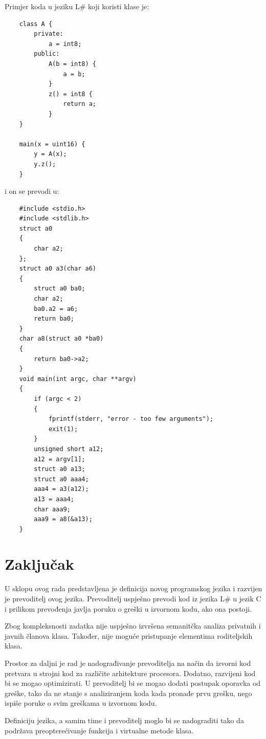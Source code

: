 \documentclass[times, utf8, zavrsni]{fer}
\begin{document}
Primjer koda u jeziku L\# koji koristi klase je:
\begin{verbatim}
    class A {
        private:
            a = int8;
        public:
            A(b = int8) {
                a = b;
            }
            z() = int8 {
                return a;
            }
    }

    main(x = uint16) {
        y = A(x);
        y.z();
    }
\end{verbatim}

i on se prevodi u:

\begin{verbatim}
    #include <stdio.h>
    #include <stdlib.h>
    struct a0
    {
        char a2;
    };
    struct a0 a3(char a6)
    {
        struct a0 ba0;
        char a2;
        ba0.a2 = a6;
        return ba0;
    }
    char a8(struct a0 *ba0)
    {
        return ba0->a2;
    }
    void main(int argc, char **argv)
    {
        if (argc < 2)
        {
            fprintf(stderr, "error - too few arguments");
            exit(1);
        }
        unsigned short a12;
        a12 = argv[1];
        struct a0 a13;
        struct a0 aaa4;
        aaa4 = a3(a12);
        a13 = aaa4;
        char aaa9;
        aaa9 = a8(&a13);
    }
\end{verbatim}

\chapter{Zaključak}
U sklopu ovog rada predstavljena je definicija novog programskog jezika i razvijen je prevoditelj ovog jezika. Prevoditelj uspješno prevodi kod iz jezika L\# u jezik
C i prilikom prevođenja javlja poruku o greški u izvornom kodu, ako ona postoji.

Zbog kompleksnosti zadatka nije uspješno izvršena semanitčka analiza privatnih i javnih članova klasa. Također, nije moguće pristupanje elementima roditeljskih klasa.

Prostor za daljni je rad je nadograđivanje prevoditelja na način da izvorni kod pretvara u strojni kod za različite arhitekture procesora. Dodatno, razvijeni kod bi se
mogao optimizirati. U prevoditelj bi se mogao dodati postupak oporavka od greške, tako da ne stanje s analiziranjem koda kada pronađe prvu grešku, nego ispiše poruke 
o svim greškama u izvornom kodu.

Definiciju jezika, a samim time i prevoditelj moglo bi se nadograditi tako da podržava preopterećivanje funkcija i virtualne metode klasa.
\end{document}
